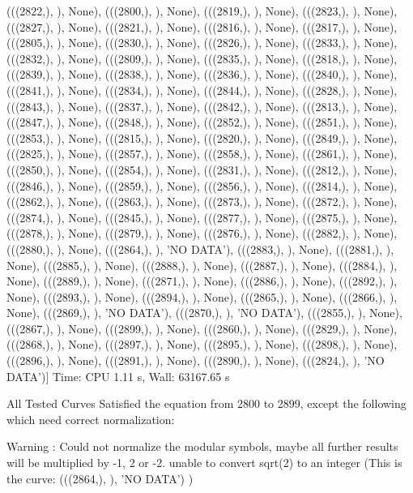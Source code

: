  (((2822,), {}), None),
 (((2800,), {}), None),
 (((2819,), {}), None),
 (((2823,), {}), None),
 (((2827,), {}), None),
 (((2821,), {}), None),
 (((2816,), {}), None),
 (((2817,), {}), None),
 (((2805,), {}), None),
 (((2830,), {}), None),
 (((2826,), {}), None),
 (((2833,), {}), None),
 (((2832,), {}), None),
 (((2809,), {}), None),
 (((2835,), {}), None),
 (((2818,), {}), None),
 (((2839,), {}), None),
 (((2838,), {}), None),
 (((2836,), {}), None),
 (((2840,), {}), None),
 (((2841,), {}), None),
 (((2834,), {}), None),
 (((2844,), {}), None),
 (((2828,), {}), None),
 (((2843,), {}), None),
 (((2837,), {}), None),
 (((2842,), {}), None),
 (((2813,), {}), None),
 (((2847,), {}), None),
 (((2848,), {}), None),
 (((2852,), {}), None),
 (((2851,), {}), None),
 (((2853,), {}), None),
 (((2815,), {}), None),
 (((2820,), {}), None),
 (((2849,), {}), None),
 (((2825,), {}), None),
 (((2857,), {}), None),
 (((2858,), {}), None),
 (((2861,), {}), None),
 (((2850,), {}), None),
 (((2854,), {}), None),
 (((2831,), {}), None),
 (((2812,), {}), None),
 (((2846,), {}), None),
 (((2859,), {}), None),
 (((2856,), {}), None),
 (((2814,), {}), None),
 (((2862,), {}), None),
 (((2863,), {}), None),
 (((2873,), {}), None),
 (((2872,), {}), None),
 (((2874,), {}), None),
 (((2845,), {}), None),
 (((2877,), {}), None),
 (((2875,), {}), None),
 (((2878,), {}), None),
 (((2879,), {}), None),
 (((2876,), {}), None),
 (((2882,), {}), None),
 (((2880,), {}), None),
 (((2864,), {}), 'NO DATA'),
 (((2883,), {}), None),
 (((2881,), {}), None),
 (((2885,), {}), None),
 (((2888,), {}), None),
 (((2887,), {}), None),
 (((2884,), {}), None),
 (((2889,), {}), None),
 (((2871,), {}), None),
 (((2886,), {}), None),
 (((2892,), {}), None),
 (((2893,), {}), None),
 (((2894,), {}), None),
 (((2865,), {}), None),
 (((2866,), {}), None),
 (((2869,), {}), 'NO DATA'),
 (((2870,), {}), 'NO DATA'),
 (((2855,), {}), None),
 (((2867,), {}), None),
 (((2899,), {}), None),
 (((2860,), {}), None),
 (((2829,), {}), None),
 (((2868,), {}), None),
 (((2897,), {}), None),
 (((2895,), {}), None),
 (((2898,), {}), None),
 (((2896,), {}), None),
 (((2891,), {}), None),
 (((2890,), {}), None),
 (((2824,), {}), 'NO DATA')]
Time: CPU 1.11 s, Wall: 63167.65 s

All Tested Curves Satisfied the equation from 2800 to 2899,
except the following which need correct normalization:

Warning : Could not normalize the modular symbols, maybe all further results will be multiplied by -1, 2 or -2.
unable to convert sqrt(2) to an integer  (This is the curve:  (((2864,), {}), 'NO DATA') )

